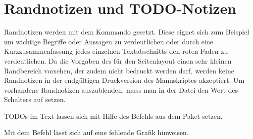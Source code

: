 \section{Randnotizen und TODO-Notizen}%
%
%
\label{sec:Randnotizen}
%
Randnotizen 
%
werden mit dem Kommando  gesetzt.
Diese eignet sich zum Beispiel um wichtige Begriffe oder Aussagen zu verdeutlichen
oder durch eine Kurzzusammenfassung jedes einzelnen Textabschnitts
den roten Faden zu verdeutlichen.
Da die Vorgaben des  für den Seitenlayout einen sehr kleinen Randbereich vorsehen, der zudem nicht bedruckt werden darf,
werden keine Randnotizen in der endgültigen Druckversion des Manuskriptes akzeptiert.
Um \ggf vorhandene Randnotizen auszublenden,
muss man in der Datei  den Wert des Schalters
 auf  setzen.

TODOs im Text lassen sich mit Hilfe des Befehls  aus dem Paket  setzen.

Mit dem Befehl  lässt sich auf eine fehlende Grafik hinweisen.

